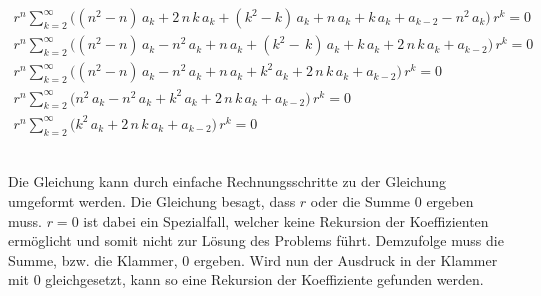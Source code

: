 \begin{align}
	\nonumber
	r^n
	\sum_{k=2}^{\infty}
	\biggl(
	\left( n^2 - n \right) \, a_k 
	+
	2 \, n \, k \, a_k
	+
	\left( k^2 - k \right) \, a_k
	+
	n \, a_k
	+
	k \, a_k
	+
	a_{k - 2}
	-
	n^2 \, a_k
	\biggr)
	\, r^k
	= 0 
	\\
	\nonumber
	r^n
	\sum_{k=2}^{\infty}
	\biggl(
	\left( n^2 - n \right) \, a_k 
	-
	n^2 \, a_k
	+
	n \, a_k
	+
	\left( k^2 - \, k \right) \, a_k
	+
	k \, a_k
	+
	2 \, n \, k \, a_k
	+
	a_{k - 2}
	\biggr)
	\, r^k
	= 0 
	\\
	\nonumber
	r^n
	\sum_{k=2}^{\infty}
	\biggl(
	\left( n^2 - n \right) \, a_k 
	-
	n^2 \, a_k
	+
	n \, a_k
	+
	k^2 \, a_k
	+
	2 \, n \, k \, a_k
	+
	a_{k - 2}
	\biggr)
	\, r^k
	= 0 
	\\
	\nonumber
	r^n
	\sum_{k=2}^{\infty}
	\biggl(
	n^2 \, a_k 
	-
	n^2 \, a_k
	+
	k^2 \, a_k
	+
	2 \, n \, k \, a_k
	+
	a_{k - 2}
	\biggr)
	\, r^k
	= 0 
	\\
	r^n
	\sum_{k=2}^{\infty}
	\biggl(
	k^2 \, a_k
	+
	2 \, n \, k \, a_k
	+
	a_{k - 2}
	\biggr)
	\, r^k
	= 0
	\label{eq:bessel:summe:zusammengefasst:vereinfacht}
\end{align}
\\
\begin{normalsize}
	Die Gleichung  kann durch einfache Rechnungsschritte zu der Gleichung  umgeformt werden.
	Die Gleichung  besagt,
	dass $r$ oder die Summe $0$ ergeben muss.
	$r = 0$ ist dabei ein Spezialfall, welcher keine Rekursion der Koeffizienten erm\"oglicht und somit nicht zur L\"osung des Problems f\"uhrt.
	Demzufolge muss die Summe, bzw. die Klammer, $0$ ergeben.
	Wird nun der Ausdruck in der Klammer mit $0$ gleichgesetzt,
	kann so eine Rekursion der Koeffiziente gefunden werden.
\end{normalsize}

